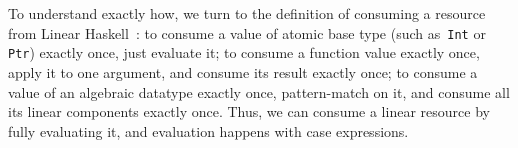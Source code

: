 \documentclass[acmsmall,review,screen]{acmart}
\newcommand{\lolli}{\multimap}
\newcommand{\tensor}{\otimes}
\begin{document}
%
%
%
%
To understand exactly how,
we turn to the definition of consuming a resource from Linear
Haskell~\cite{cite:linearhaskell}:
to consume a value of atomic base type (such as~\texttt{Int} or
        \texttt{Ptr}) exactly once, just evaluate it;
        to consume a function value exactly once, apply it to one argument,
        and consume its result exactly once;
        to consume a value of an algebraic datatype exactly once,
        pattern-match on it, and consume all its linear components exactly once.
Thus, we can consume a linear resource by fully evaluating it, and evaluation
happens with case expressions.

\end{document}
